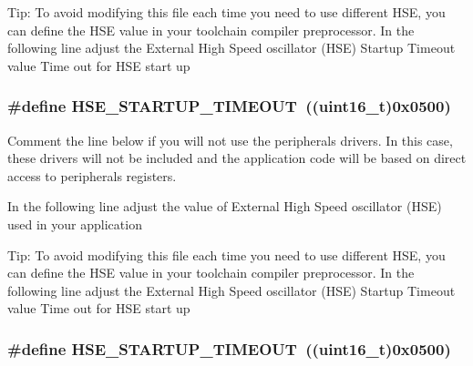 Tip\-: To avoid modifying this file each time you need to use different H\-S\-E, you can define the H\-S\-E value in your toolchain compiler preprocessor. In the following line adjust the External High Speed oscillator (H\-S\-E) Startup Timeout value Time out for H\-S\-E start up \hypertarget{group___library__configuration__section_ga68ecbc9b0a1a40a1ec9d18d5e9747c4f}{
\subsubsection[{H\-S\-E\-\_\-\-S\-T\-A\-R\-T\-U\-P\-\_\-\-T\-I\-M\-E\-O\-U\-T}]{\setlength{\rightskip}{0pt plus 5cm}\#define H\-S\-E\-\_\-\-S\-T\-A\-R\-T\-U\-P\-\_\-\-T\-I\-M\-E\-O\-U\-T~((uint16\-\_\-t)0x0500)}}\label{group___library__configuration__section_ga68ecbc9b0a1a40a1ec9d18d5e9747c4f}


Comment the line below if you will not use the peripherals drivers. In this case, these drivers will not be included and the application code will be based on direct access to peripherals registers. 

In the following line adjust the value of External High Speed oscillator (H\-S\-E) used in your application

Tip\-: To avoid modifying this file each time you need to use different H\-S\-E, you can define the H\-S\-E value in your toolchain compiler preprocessor. In the following line adjust the External High Speed oscillator (H\-S\-E) Startup Timeout value Time out for H\-S\-E start up \hypertarget{group___library__configuration__section_ga68ecbc9b0a1a40a1ec9d18d5e9747c4f}{
\subsubsection[{H\-S\-E\-\_\-\-S\-T\-A\-R\-T\-U\-P\-\_\-\-T\-I\-M\-E\-O\-U\-T}]{\setlength{\rightskip}{0pt plus 5cm}\#define H\-S\-E\-\_\-\-S\-T\-A\-R\-T\-U\-P\-\_\-\-T\-I\-M\-E\-O\-U\-T~((uint16\-\_\-t)0x0500)}}\label{group___library__configuration__section_ga68ecbc9b0a1a40a1ec9d18d5e9747c4f}


